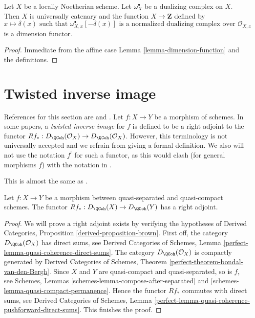 \begin{lemma}
\label{lemma-dimension-function-scheme}
Let $X$ be a locally Noetherian scheme. Let $\omega_X^\bullet$
be a dualizing complex on $X$. Then $X$ is universally catenary
and the function
$X \to \mathbf{Z}$ defined by
$$
x \longmapsto \delta(x)\text{ such that }
\omega_{X, x}^\bullet[-\delta(x)]
\text{ is a normalized dualizing complex over }
\mathcal{O}_{X, x}
$$
is a dimension functor.
\end{lemma}

\begin{proof}
Immediate from the affine case
Lemma \ref{lemma-dimension-function}
and the definitions.
\end{proof}






\section{Twisted inverse image}
\label{section-twisted-inverse-image}

\noindent
References for this section are \cite{Neeman-Grothendieck} and \cite{LN}.
Let $f : X \to Y$ be a morphism of schemes.
In some papers, a {\it twisted inverse image} for $f$ is
defined to be a right adjoint to the functor
$Rf_* : D_\QCoh(\mathcal{O}_X) \to D_\QCoh(\mathcal{O}_X)$.
However, this terminology is not universally accepted and we refrain
from giving a formal definition. We also will not use
the notation $f^!$ for such a functor, as this would clash
(for general morphisms $f$) with the notation in \cite{R+D}.

\begin{lemma}
\label{lemma-twisted-inverse-image}
\begin{reference}
This is almost the same as \cite[Example 4.2]{Neeman-Grothendieck}.
\end{reference}
Let $f : X \to Y$ be a morphism between quasi-separated and quasi-compact
schemes. The functor $Rf_* : D_\QCoh(X) \to D_\QCoh(Y)$ has a
right adjoint.
\end{lemma}

\begin{proof}
We will prove a right adjoint exists by verifying the hypotheses of
Derived Categories, Proposition \ref{derived-proposition-brown}.
First off, the category $D_\QCoh(\mathcal{O}_X)$ has direct sums, see
Derived Categories of Schemes, Lemma
\ref{perfect-lemma-quasi-coherence-direct-sums}.
The category $D_\QCoh(\mathcal{O}_X)$ is compactly generated by
Derived Categories of Schemes, Theorem
\ref{perfect-theorem-bondal-van-den-Bergh}.
Since $X$ and $Y$ are quasi-compact and quasi-separated, so is $f$, see
Schemes, Lemmas \ref{schemes-lemma-compose-after-separated} and
\ref{schemes-lemma-quasi-compact-permanence}.
Hence the functor $Rf_*$ commutes with direct sums, see
Derived Categories of Schemes, Lemma
\ref{perfect-lemma-quasi-coherence-pushforward-direct-sums}.
This finishes the proof.
\end{proof}

